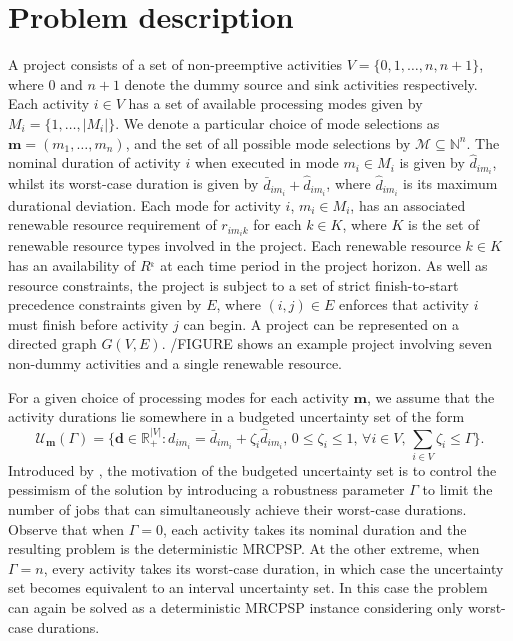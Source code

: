\documentclass[a4paper,abstracton]{scrartcl}
\newcommand{\M}{{\mathcal{M}}}
\newcommand{\U}{{\mathcal{U}}}
\begin{document}
\section{Problem description}

A project consists of a set of non-preemptive activities $V=\{0,1,\dots,n,n+1\}$, where 0 and $n+1$ denote the dummy source and sink activities respectively. Each activity $i\in V$ has a set of available processing modes given by $M_i=\{1,\dots,|M_i|\}$. We denote a particular choice of mode selections as $\bm{m}=(m_1,\dots,m_n)$, and the set of all possible mode selections by $\M\subseteq \mathbb{N}^n$. The nominal duration of activity $i$ when executed in mode $m_i\in M_i$ is given by $\hat{d}_{im_i}$, whilst its worst-case duration is given by $\bar{d}_{im_i}+\hat{d}_{im_i}$, where $\hat{d}_{im_i}$ is its maximum durational deviation. Each mode for activity $i$, $m_i\in M_i$, has an associated renewable resource requirement of $r_{im_ik}$ for each $k\in K$, where $K$ is the set of renewable resource types involved in the project. Each renewable resource $k\in K$ has an availability of $R^_{k}$ at each time period in the project horizon. As well as resource constraints, the project is subject to a set of strict finish-to-start precedence constraints given by $E$, where $(i,j)\in E$ enforces that activity $i$ must finish before activity $j$ can begin. A project can be represented on a directed graph $G(V,E)$. /FIGURE shows an example project involving seven non-dummy activities and a single renewable resource.

For a given choice of processing modes for each activity $\bm{m}$, we assume that the activity durations lie somewhere in a budgeted uncertainty set of the form
$$\U_{\bm{m}}(\Gamma)=\Bigg\{\bm{d}\in\mathbb{R}_+^{|V|}:d_{im_i}=\bar{d}_{im_i}+\zeta_i\hat{d}_{im_i},\,0\leq \zeta_i \leq 1,\,\forall i\in V,\,\sum_{i\in V}\zeta_i \leq \Gamma\Bigg\}.$$
Introduced by \cite{bertsimas2004price}, the motivation of the budgeted uncertainty set is to control the pessimism of the solution by introducing a robustness parameter $\Gamma$ to limit the number of jobs that can simultaneously achieve their worst-case durations. Observe that when $\Gamma=0$, each activity takes its nominal duration and the resulting problem is the deterministic MRCPSP. At the other extreme, when $\Gamma=n$, every activity takes its worst-case duration, in which case the uncertainty set becomes equivalent to an interval uncertainty set. In this case the problem can again be solved as a deterministic MRCPSP instance considering only worst-case durations.
\end{document}
